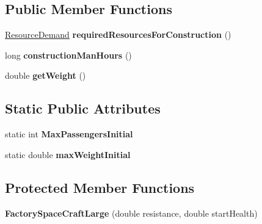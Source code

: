 \subsection*{Public Member Functions}
\begin{DoxyCompactItemize}
\item 
\hyperlink{classuniverse_1_1_resource_demand}{Resource\+Demand} {\bfseries required\+Resources\+For\+Construction} ()\hypertarget{classtools_1_1vehicles_1_1space_1_1_factory_space_craft_large_a0d8075bff9f9d2c91154e57bab7206e0}{}\label{classtools_1_1vehicles_1_1space_1_1_factory_space_craft_large_a0d8075bff9f9d2c91154e57bab7206e0}

\item 
long {\bfseries construction\+Man\+Hours} ()\hypertarget{classtools_1_1vehicles_1_1space_1_1_factory_space_craft_large_a35ae53ed1364e94986bad86ac4e7376a}{}\label{classtools_1_1vehicles_1_1space_1_1_factory_space_craft_large_a35ae53ed1364e94986bad86ac4e7376a}

\item 
double {\bfseries get\+Weight} ()\hypertarget{classtools_1_1vehicles_1_1space_1_1_factory_space_craft_large_a8a6ec2adbc92b013e3c04b9b3ac419a6}{}\label{classtools_1_1vehicles_1_1space_1_1_factory_space_craft_large_a8a6ec2adbc92b013e3c04b9b3ac419a6}

\end{DoxyCompactItemize}
\subsection*{Static Public Attributes}
\begin{DoxyCompactItemize}
\item 
static int {\bfseries Max\+Passengers\+Initial}\hypertarget{classtools_1_1vehicles_1_1space_1_1_factory_space_craft_large_ac22ac383e32fc27b5685f156274e97fd}{}\label{classtools_1_1vehicles_1_1space_1_1_factory_space_craft_large_ac22ac383e32fc27b5685f156274e97fd}

\item 
static double {\bfseries max\+Weight\+Initial}\hypertarget{classtools_1_1vehicles_1_1space_1_1_factory_space_craft_large_a2881958723c139b8220d88bd369230a1}{}\label{classtools_1_1vehicles_1_1space_1_1_factory_space_craft_large_a2881958723c139b8220d88bd369230a1}

\end{DoxyCompactItemize}
\subsection*{Protected Member Functions}
\begin{DoxyCompactItemize}
\item 
{\bfseries Factory\+Space\+Craft\+Large} (double resistance, double start\+Health)\hypertarget{classtools_1_1vehicles_1_1space_1_1_factory_space_craft_large_abfc3f6642418ea2cdf6fd034d8c98682}{}\label{classtools_1_1vehicles_1_1space_1_1_factory_space_craft_large_abfc3f6642418ea2cdf6fd034d8c98682}

\end{DoxyCompactItemize}
